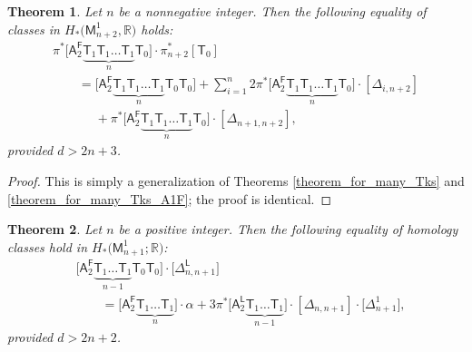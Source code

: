 \documentclass[pdftex]{sigma}
\numberwithin{equation}{section}
\newtheorem{thm}{Theorem}[section]
\begin{document}
\begin{thm}
\label{theorem_for_many_Tks_A2F_2_T0}
Let $n$ be a nonnegative integer.
Then the following equality of classes in $H_*\bigl(\mathsf{M}_{{n+2}}^1, \mathbb{R}\bigr)$ holds:
\begin{gather*}
\pi^{\ast}\bigl[\mathsf{A}_2^{\mathsf{F}} \underbrace{ \mathsf{T}_{1} \mathsf{T}_{1} \dots \mathsf{T}_{1}}_{n} \mathsf{T}_0\bigr]\cdot
\pi_{n+2}^{\ast} [\mathsf{T}_0]\\
\qquad =
\bigl[\mathsf{A}_2^{\mathsf{F}} \underbrace{\mathsf{T}_{1} \mathsf{T}_{1} \dots \mathsf{T}_{1}}_{n} \mathsf{T}_{0} \mathsf{T}_0\bigr] + \sum_{i=1}^{n} 2 \pi^{\ast}\bigl[\mathsf{A}_2^{\mathsf{F}}
\underbrace{\mathsf{T}_{1} \mathsf{T}_{1} \dots \mathsf{T}_{1}}_{n} \mathsf{T}_0\bigr] \cdot [\Delta_{i, {n+2}}] \nonumber \\
 \phantom{\qquad =}{}+ \pi^{\ast}\bigl[\mathsf{A}_2^{\mathsf{F}}
\underbrace{\mathsf{T}_{1} \mathsf{T}_{1} \dots \mathsf{T}_{1}}_{n} \mathsf{T}_0\bigr] \cdot [\Delta_{{n+1}, {n+2}}], \label{many_Tks_A2F_2_T0}
\end{gather*}
provided $d > 2n+3$.
\end{thm}

\begin{proof} This is simply a generalization of Theorems \ref{theorem_for_many_Tks} and \ref{theorem_for_many_Tks_A1F}; the proof is identical.
\end{proof}

\begin{thm}\label{Tk1Tk2_etc_alt_way_A2F}
Let $n$ be a positive integer.
Then the following equality of homology classes hold in
$H_*\bigl(\mathsf{M}^1_{n+1}; \mathbb{R}\bigr)$:
\begin{align}
&\bigl[\mathsf{A}_2^{\mathsf{F}} \underbrace{\mathsf{T}_{1} \dots \mathsf{T}_{1}}_{n-1} \mathsf{T}_{0} \mathsf{T}_0\bigr]
\cdot \bigl[\Delta_{n, {n+1}}^{\mathsf{L}}\bigr]\nonumber\\
&\qquad{} = \bigl[\mathsf{A}_2^{\mathsf{F}} \underbrace{\mathsf{T}_{1} \dots\mathsf{T}_{1}}_n\bigr] \cdot \alpha
+ 3 \pi^{\ast}\bigl[\mathsf{A}_2^{\mathsf{L}} \underbrace{ \mathsf{T}_{1} \dots \mathsf{T}_{1}}_{n-1}\bigr]
\cdot [\Delta_{n, n+1}]\cdot \bigl[\Delta^1_{n+1}\bigr], \label{Tmu_T0_nu_alt_way_A2F}
\end{align}
provided $d > 2n+2$.
\end{thm}
\end{document}
